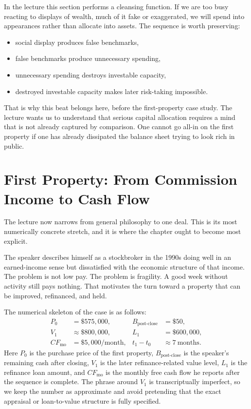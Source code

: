 In the lecture this section performs a cleansing function. If we are too busy reacting to displays of wealth, much of it fake or exaggerated, we will spend into appearances rather than allocate into assets. The sequence is worth preserving:
\begin{itemize}
\item social display produces false benchmarks,
\item false benchmarks produce unnecessary spending,
\item unnecessary spending destroys investable capacity,
\item destroyed investable capacity makes later risk-taking impossible.
\end{itemize}

That is why this beat belongs here, before the first-property case study. The lecture wants us to understand that serious capital allocation requires a mind that is not already captured by comparison. One cannot go all-in on the first property if one has already dissipated the balance sheet trying to look rich in public.

\section{First Property: From Commission Income to Cash Flow}

The lecture now narrows from general philosophy to one deal. This is its most numerically concrete stretch, and it is where the chapter ought to become most explicit.

The speaker describes himself as a stockbroker in the 1990s doing well in an earned-income sense but dissatisfied with the economic structure of that income. The problem is not low pay. The problem is fragility. A good week without activity still pays nothing. That motivates the turn toward a property that can be improved, refinanced, and held.

The numerical skeleton of the case is as follows:
\begin{align}
P_0 &= \$575{,}000, &
B_{\text{post-close}} &= \$50, \\
V_1 &\approx \$800{,}000, &
L_1 &= \$600{,}000, \\
CF_{\text{mo}} &= \$5{,}000/\text{month}, &
t_1 - t_0 &\approx 7\ \text{months}.
\end{align}
Here \(P_0\) is the purchase price of the first property, \(B_{\text{post-close}}\) is the speaker's remaining cash after closing, \(V_1\) is the later refinance-related value level, \(L_1\) is the refinance loan amount, and \(CF_{\text{mo}}\) is the monthly free cash flow he reports after the sequence is complete. The phrase around \(V_1\) is transcriptually imperfect, so we keep the number as approximate and avoid pretending that the exact appraisal or loan-to-value structure is fully specified.

